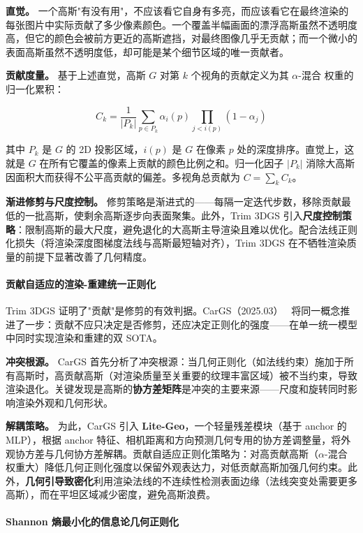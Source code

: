 \textbf{直觉。} 一个高斯"有没有用"，不应该看它自身有多亮，而应该看它在最终渲染的每张图片中实际贡献了多少像素颜色。一个覆盖半幅画面的漂浮高斯虽然不透明度高，但它的颜色会被前方更近的高斯遮挡，对最终图像几乎无贡献；而一个微小的表面高斯虽然不透明度低，却可能是某个细节区域的唯一贡献者。

\textbf{贡献度量。} 基于上述直觉，高斯 $G$ 对第 $k$ 个视角的贡献定义为其 $\alpha$-混合 权重的归一化累积：

\begin{equation}
C_k = \frac{1}{|P_k|} \sum_{p \in P_k} \alpha_i(p) \prod_{j<i(p)}(1-\alpha_j)
\end{equation}

其中 $P_k$ 是 $G$ 的 2D 投影区域，$i(p)$ 是 $G$ 在像素 $p$ 处的深度排序。直觉上，这就是 $G$ 在所有它覆盖的像素上贡献的颜色比例之和。归一化因子 $|P_k|$ 消除大高斯因面积大而获得不公平高贡献的偏差。多视角总贡献为 $C = \sum_k C_k$。

\textbf{渐进修剪与尺度控制。} 修剪策略是渐进式的——每隔一定迭代步数，移除贡献最低的一批高斯，使剩余高斯逐步向表面聚集。此外，Trim 3DGS 引入\textbf{尺度控制策略}：限制高斯的最大尺度，避免退化的大高斯主导渲染且难以优化。配合法线正则化损失（将渲染深度图梯度法线与高斯最短轴对齐），Trim 3DGS 在不牺牲渲染质量的前提下显著改善了几何精度。

\paragraph{贡献自适应的渲染-重建统一正则化}

Trim 3DGS 证明了"贡献"是修剪的有效判据。CarGS（2025.03）~\cite{2503_00881} 将同一概念推进了一步：贡献不应只决定是否修剪，还应决定正则化的强度——在单一统一模型中同时实现渲染和重建的双 SOTA。

\textbf{冲突根源。} CarGS 首先分析了冲突根源：当几何正则化（如法线约束）施加于所有高斯时，高贡献高斯（对渲染质量至关重要的纹理丰富区域）被不当约束，导致渲染退化。关键发现是高斯的\textbf{协方差矩阵}是冲突的主要来源——尺度和旋转同时影响渲染外观和几何形状。

\textbf{解耦策略。} 为此，CarGS 引入 \textbf{Lite-Geo}，一个轻量残差模块（基于 anchor 的 MLP），根据 anchor 特征、相机距离和方向预测几何专用的协方差调整量，将外观协方差与几何协方差解耦。贡献自适应正则化策略为：对高贡献高斯（$\alpha$-混合 权重大）降低几何正则化强度以保留外观表达力，对低贡献高斯加强几何约束。此外，\textbf{几何引导致密化}利用渲染法线的不连续性检测表面边缘（法线突变处需要更多高斯），而在平坦区域减少密度，避免高斯浪费。

\paragraph{Shannon 熵最小化的信息论几何正则化}

